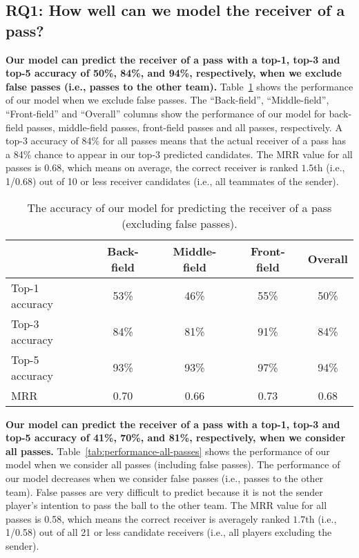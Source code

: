 \subsection{RQ1: How well can we model the receiver of a pass?}\label{RQ2-results}

\textbf{Our model can predict the receiver of a pass with a top-1, top-3 and top-5 accuracy of 50\%, 84\%, and 94\%, respectively, when we exclude false passes (i.e., passes to the other team).}
Table~\ref{tab:performance-accurate-passes} shows the performance of our model when we exclude false passes. 
The ``Back-field'', ``Middle-field'', ``Front-field'' and ``Overall'' columns show the performance of our model for back-field passes, middle-field passes, front-field passes and all passes, respectively. 
A top-3 accuracy of 84\% for all passes means that the actual receiver of a pass has a 84\% chance to appear in our top-3 predicted candidates.
The MRR value for all passes is 0.68, which means on average, the correct receiver is ranked $1.5$th (i.e., 1/0.68) out of 10 or less receiver candidates (i.e., all teammates of the sender).


\begin{table}[!t]
\caption{The accuracy of our model for predicting the receiver of a pass (excluding false passes).}
\centering
\begin{tabular}{lcccc}
  \toprule
  & Back-field & Middle-field & Front-field & Overall \\
  \midrule
  Top-1 accuracy & 53\% & 46\% & 55\% & 50\% \\
  Top-3 accuracy & 84\% & 81\% & 91\% & 84\% \\
  Top-5 accuracy & 93\% & 93\% & 97\% & 94\% \\
  MRR & 0.70 & 0.66 & 0.73 & 0.68 \\
  \bottomrule
\end{tabular}
\label{tab:performance-accurate-passes}
\end{table}

\textbf{Our model can predict the receiver of a pass with a top-1, top-3 and top-5 accuracy of 41\%, 70\%, and 81\%, respectively, when we consider all passes.}
Table~\ref{tab:performance-all-passes} shows the performance of our model when we consider all passes (including false passes). 
The performance of our model decreases when we consider false passes (i.e., passes to the other team). 
False passes are very difficult to predict because it is not the sender player's intention to pass the ball to the other team. 
The MRR value for all passes is 0.58, which means the correct receiver is averagely ranked $1.7$th (i.e., 1/0.58) out of all 21 or less candidate receivers (i.e., all players excluding the sender).

